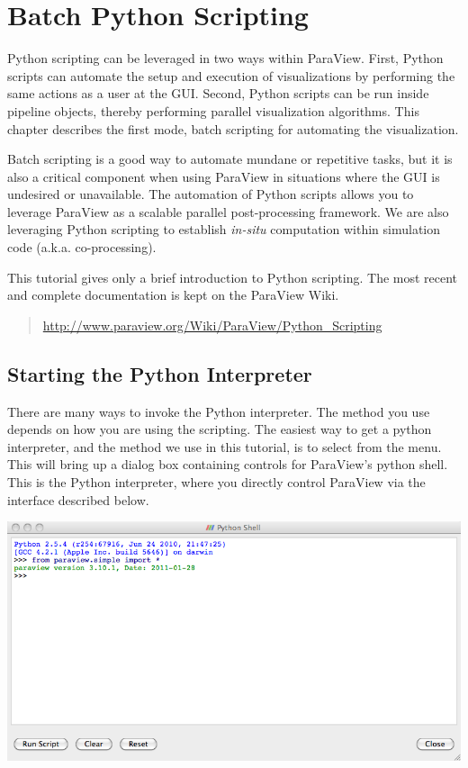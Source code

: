 \chapter{Batch Python Scripting}
\label{chap:BatchPythonScripting}

Python scripting can be leveraged in two ways within ParaView.  First,
Python scripts can automate the setup and execution of visualizations by
performing the same actions as a user at the GUI.  Second, Python scripts
can be run inside pipeline objects, thereby performing parallel
visualization algorithms.  This chapter describes the first mode, batch
scripting for automating the visualization.

Batch scripting is a good way to automate mundane or repetitive tasks, but
it is also a critical component when using ParaView in situations where the
GUI is undesired or unavailable.  The automation of Python scripts allows
you to leverage ParaView as a scalable parallel post-processing framework.
We are also leveraging Python scripting to establish \emph{in-situ}
computation within simulation code (a.k.a. co-processing).

This tutorial gives only a brief introduction to Python scripting.  The
most recent and complete documentation is kept on the ParaView Wiki.

\begin{quote}
  \href{http://www.paraview.org/Wiki/ParaView/Python_Scripting}{http://www.paraview.org/Wiki/ParaView/Python\_Scripting}
\end{quote}

\section{Starting the Python Interpreter}
\label{sec:StartingThePythonInterpreter}

There are many ways to invoke the Python interpreter.  The method you use
depends on how you are using the scripting.  The easiest way to get a
python interpreter, and the method we use in this tutorial, is to select
 \ra {} from the menu.  This will bring up a
dialog box containing controls for ParaView's python shell. This is the 
Python interpreter, where you directly control
ParaView via the interface described below. 

\begin{inlinefig}
  \includegraphics[width=.9\linewidth]{images/PythonShellDialog}
\end{inlinefig}

